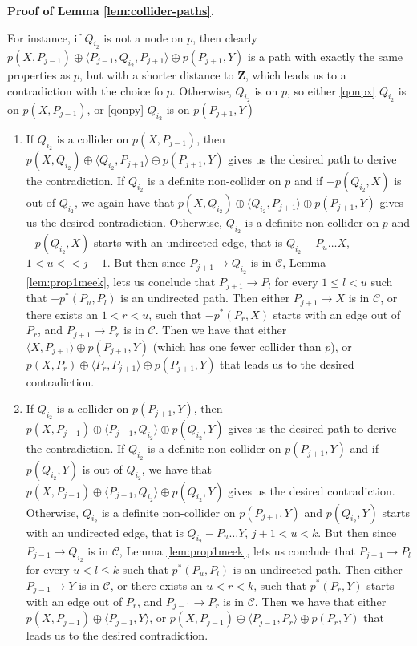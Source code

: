 \documentclass[11pt]{article}
\newcommand{\mb}[1]{\mathbf{#1}}
\newcommand{\g}[1][G]{\mathcal{#1}}
\newenvironment{proofofnoqed}[1][]{\noindent \textbf{Proof of #1.}}{}
\begin{document}
\begin{proofofnoqed}[Lemma \ref{lem:collider-paths}]
\begin{enumerate}
        For instance, if $Q_{i_2}$ is not a node on $p$, then clearly $p(X,P_{j-1}) \oplus \langle P_{j-1}, Q_{i_2}, P_{j+1} \rangle \oplus p(P_{j+1}, Y)$ is a path with exactly the same properties as $p$, but with a shorter distance to $\mb{Z}$, which leads us to a contradiction with the choice fo $p$. Otherwise, $Q_{i_2}$ is on $p$, so either \ref{qonpx} $Q_{i_2}$ is on $p(X,P_{j-1})$, or \ref{qonpy} $Q_{i_2}$ is on $p(P_{j+1},Y)$
        \begin{enumerate}[label=(\alph*)]
            \item\label{qonpx}
            If $Q_{i_2}$ is a collider on $p(X,P_{j-1})$, then $p(X, Q_{i_2}) \oplus \langle Q_{i_2}, P_{j+1} \rangle \oplus p(P_{j+1}, Y)$ gives us the desired path to derive the contradiction. If $Q_{i_2}$ is a definite non-collider on $p$ and if $-p(Q_{i_2}, X)$ is out of $Q_{i_2}$, we again have that $p(X, Q_{i_2}) \oplus \langle Q_{i_2}, P_{j+1} \rangle \oplus p(P_{j+1}, Y)$ gives us the desired contradiction. Otherwise, $Q_{i_2}$ is a definite non-collider on $p$ and $-p(Q_{i_2}, X)$ starts with an undirected edge, that is $Q_{i_2} - P_{u} \dots X$, $1 < u < < j-1$. But then since $P_{j+1} \to Q_{i_2}$ is in $\g[C]$, Lemma \ref{lem:prop1meek}, lets us conclude that $P_{j+1} \to P_{l}$ for every $1 \le l < u$ such that $-p^{*}(P_u, P_l)$ is an undirected path. Then either $P_{j+1} \to X$ is in $\g[C]$, or there exists an $1< r < u$, such that $-p^{*}(P_r, X)$ starts with an edge out of $P_r$, and $P_{j+1} \to P_r$ is in $\g[C].$ Then we have that either $\langle X, P_{j+1} \rangle \oplus p(P_{j+1}, Y)$ (which has one fewer collider than $p$), or $p(X,P_r) \oplus \langle P_r, P_{j+1} \rangle \oplus p(P_{j+1}, Y)$ that leads us to the desired contradiction. 

            \item\label{qonpy}
            If $Q_{i_2}$ is a collider on $p(P_{j+1},Y)$, then $p(X, P_{j-1}) \oplus \langle P_{j-1}, Q_{i_2} \rangle \oplus p(Q_{i_2}, Y)$ gives us the desired path to derive the contradiction. If $Q_{i_2}$ is a definite non-collider on $p(P_{j+1},Y)$ and if $p(Q_{i_2}, Y)$ is out of $Q_{i_2}$, we have that $p(X, P_{j-1}) \oplus \langle P_{j-1}, Q_{i_2} \rangle \oplus p(Q_{i_2}, Y)$ gives us the desired contradiction. Otherwise, $Q_{i_2}$ is a definite non-collider on $p(P_{j+1},Y)$ and $p(Q_{i_2}, Y)$ starts with an undirected edge, that is $Q_{i_2} - P_{u} \dots Y$, $j+1 < u < k$. But then since $P_{j-1} \to Q_{i_2}$ is in $\g[C]$, Lemma \ref{lem:prop1meek}, lets us conclude that $P_{j-1} \to P_{l}$ for every $u< l \le k$ such that $p^{*}(P_u, P_l)$ is an undirected path. Then either $P_{j-1} \to Y$ is in $\g[C]$, or there exists an $u< r <k$, such that $p^{*}(P_r, Y)$ starts with an edge out of $P_r$, and $P_{j-1} \to P_r$ is in $\g[C].$ Then we have that either $p( X, P_{j-1})\oplus \langle P_{j-1}, Y \rangle$, or $p(X, P_{j-1}) \oplus \langle P_{j-1}, P_{r} \rangle \oplus p(P_{r}, Y)$ that leads us to the desired contradiction. 
        \end{enumerate} 
        

\end{enumerate}
\end{proofofnoqed}
\end{document}
